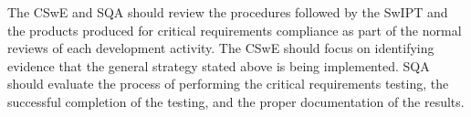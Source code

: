 The CSwE and SQA should review the procedures followed by the SwIPT and the products produced for critical requirements compliance as part of the normal reviews
of each development activity. The CSwE should focus on
identifying evidence that the general strategy stated above
is being implemented. SQA should evaluate the process of
performing the critical requirements testing, the successful
completion of the testing, and the proper documentation of
the results.